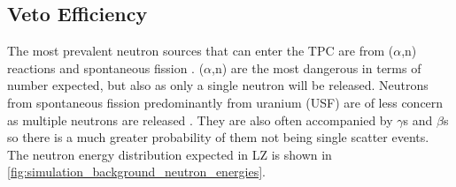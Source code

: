 \subsection{Veto Efficiency}
\label{sec:od_simulation_efficiency}
\par
The most prevalent neutron sources that can enter the TPC are from ($\alpha$,n) reactions and spontaneous fission \cite{LZ_projected_sensitivity_paper_ref}.
($\alpha$,n) are the most dangerous in terms of number expected, but also as only a single neutron will be released.
Neutrons from spontaneous fission predominantly from uranium (USF) are of less concern as multiple neutrons are released \cite{usf_ref}.
They are also often accompanied by $\gamma$s and $\beta$s so there is a much greater probability of them not being single scatter events.
The neutron energy distribution expected in LZ is shown in \autoref{fig:simulation_background_neutron_energies}.


